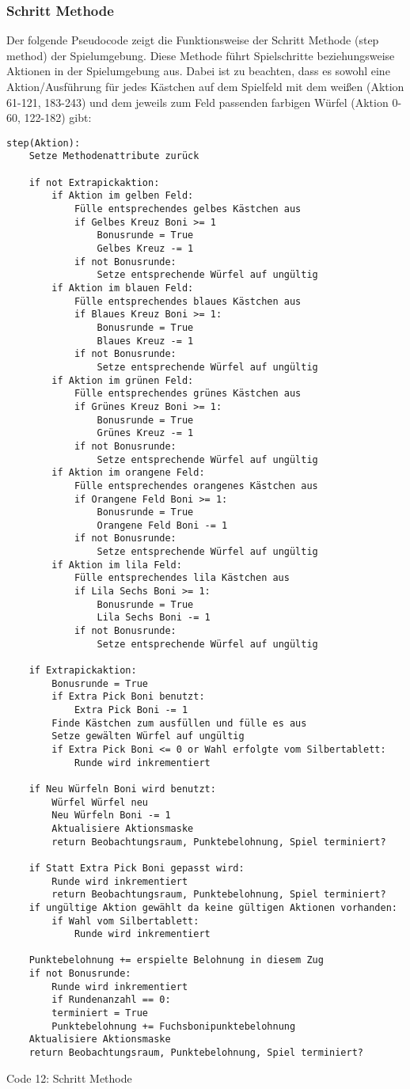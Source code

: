 \subsubsection{Schritt Methode}
Der folgende Pseudocode zeigt die Funktionsweise der Schritt Methode (step method) der Spielumgebung. Diese Methode führt Spielschritte beziehungsweise Aktionen in der Spielumgebung aus. Dabei ist zu beachten, dass es sowohl eine Aktion/Ausführung für jedes Kästchen auf dem Spielfeld mit dem weißen (Aktion 61-121, 183-243) und dem jeweils zum Feld passenden farbigen Würfel (Aktion 0-60, 122-182) gibt:
\vspace{0.5cm}
\begin{lstlisting}
step(Aktion):
	Setze Methodenattribute zurück
	
	if not Extrapickaktion:
		if Aktion im gelben Feld:
			Fülle entsprechendes gelbes Kästchen aus
			if Gelbes Kreuz Boni >= 1
				Bonusrunde = True
				Gelbes Kreuz -= 1
			if not Bonusrunde:
				Setze entsprechende Würfel auf ungültig
		if Aktion im blauen Feld:
			Fülle entsprechendes blaues Kästchen aus
			if Blaues Kreuz Boni >= 1:
				Bonusrunde = True
				Blaues Kreuz -= 1
			if not Bonusrunde:
				Setze entsprechende Würfel auf ungültig
		if Aktion im grünen Feld:
			Fülle entsprechendes grünes Kästchen aus
			if Grünes Kreuz Boni >= 1:
				Bonusrunde = True
				Grünes Kreuz -= 1
			if not Bonusrunde:
				Setze entsprechende Würfel auf ungültig
		if Aktion im orangene Feld:
			Fülle entsprechendes orangenes Kästchen aus
			if Orangene Feld Boni >= 1:
				Bonusrunde = True
				Orangene Feld Boni -= 1
			if not Bonusrunde:
				Setze entsprechende Würfel auf ungültig
		if Aktion im lila Feld:
			Fülle entsprechendes lila Kästchen aus
			if Lila Sechs Boni >= 1:
				Bonusrunde = True
				Lila Sechs Boni -= 1
			if not Bonusrunde:
				Setze entsprechende Würfel auf ungültig
	
	if Extrapickaktion:
		Bonusrunde = True
		if Extra Pick Boni benutzt:
			Extra Pick Boni -= 1
		Finde Kästchen zum ausfüllen und fülle es aus
		Setze gewälten Würfel auf ungültig
		if Extra Pick Boni <= 0 or Wahl erfolgte vom Silbertablett:
			Runde wird inkrementiert
			
	if Neu Würfeln Boni wird benutzt:
		Würfel Würfel neu
		Neu Würfeln Boni -= 1
		Aktualisiere Aktionsmaske
		return Beobachtungsraum, Punktebelohnung, Spiel terminiert?
		
	if Statt Extra Pick Boni gepasst wird:
		Runde wird inkrementiert
		return Beobachtungsraum, Punktebelohnung, Spiel terminiert?
	if ungültige Aktion gewählt da keine gültigen Aktionen vorhanden:
		if Wahl vom Silbertablett:
			Runde wird inkrementiert
			
	Punktebelohnung += erspielte Belohnung in diesem Zug
	if not Bonusrunde:
		Runde wird inkrementiert
		if Rundenanzahl == 0:
		terminiert = True
		Punktebelohnung += Fuchsbonipunktebelohnung
	Aktualisiere Aktionsmaske
	return Beobachtungsraum, Punktebelohnung, Spiel terminiert?		
\end{lstlisting}
Code 12: Schritt Methode\\

